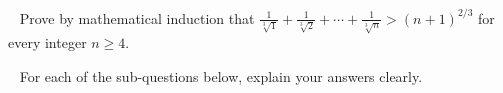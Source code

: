 \documentclass[letterpaper,11pt,addpoints]{exam}
\newcommand{\R}{\mathbb{R}}                     %
\newcommand{\Z}{\mathbb{Z}}                     %
\newcommand{\Q}{\mathbb{Q}}                     %
\begin{document}
\begin{questions}
\question[16]~
Prove by mathematical induction that $\frac{1}{\sqrt[3]{1}}+\frac{1}{\sqrt[3]{2}}+\cdots+\frac{1}{\sqrt[3]{n}}>(n+1)^{2/3}$ for every integer $n\ge 4$.

\question[25]~
For each of the sub-questions below, explain your answers clearly. 
\begin{parts}

\end{parts}
\end{questions}
\end{document}
